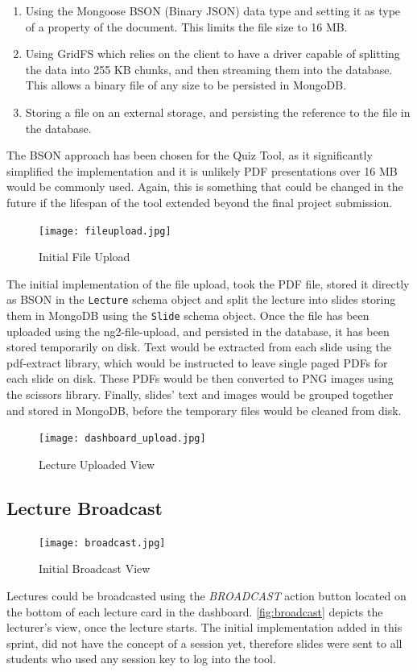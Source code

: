 \begin{enumerate}
  \item Using the Mongoose BSON (Binary JSON)\cite{49} data type and setting it as type of a property of the document.
    This limits the file size to 16 MB.
  \item Using GridFS\cite{50} which relies on the client to have a driver capable of splitting the data into 255 KB
    chunks, and then streaming them into the database. This allows a binary file of any size to be persisted
    in MongoDB.
  \item Storing a file on an external storage, and persisting the reference to the file in the database.
\end{enumerate}

The BSON approach has been chosen for the Quiz Tool, as it significantly simplified the implementation and it is
unlikely PDF presentations over 16 MB would be commonly used. Again, this is something that could be changed
in the future if the lifespan of the tool extended beyond the final project submission.

\begin{figure}[h!]
    \centering
    \texttt{[image: fileupload.jpg]}
    \caption{Initial File Upload}
    \label{fig:initialfileupload}
\end{figure}

The initial implementation of the file upload, took the PDF file, stored it directly as BSON in the
\texttt{Lecture} schema object and split the lecture into slides storing them in MongoDB using
the \texttt{Slide} schema object. Once the file has been uploaded using the ng2-file-upload\cite{51},
and persisted in the database, it has been stored temporarily on disk. Text would be extracted from
each slide using the pdf-extract\cite{52} library, which would be instructed to leave single paged
PDFs for each slide on disk. These PDFs would be then converted to PNG images using the scissors\cite{53}
library. Finally, slides' text and images would be grouped together and stored in MongoDB, before the
temporary files would be cleaned from disk.

\begin{figure}[ht]
    \centering
    \texttt{[image: dashboard\_upload.jpg]}
    \caption{Lecture Uploaded View}
    \label{fig:dashboarduploaded}
\end{figure}

\subsection{Lecture Broadcast}
\label{subsection:lecturebroadcast}
\begin{figure}[h!]
    \centering
    \texttt{[image: broadcast.jpg]}
    \caption{Initial Broadcast View}
    \label{fig:broadcast}
\end{figure}
Lectures could be broadcasted using the \textit{BROADCAST} action button located on the bottom
of each lecture card in the dashboard. \autoref{fig:broadcast} depicts the lecturer's view,
once the lecture starts. The initial implementation added in this sprint, did not have the
concept of a session yet, therefore slides were sent to all students who used any session key
to log into the tool.

